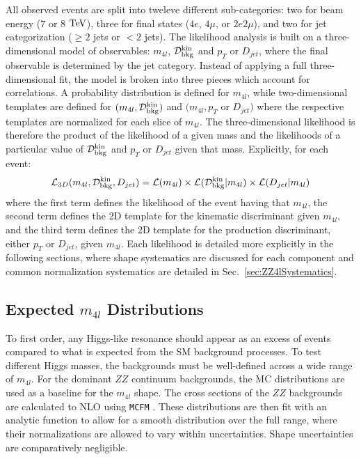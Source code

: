 All observed events are split into tweleve different sub-categories: two for beam energy ($7$ or $8$ $\rm{TeV}$), three for final states ($4e$, $4\mu$, or $2e2\mu$), and two for jet categorization ($\geq2$ jets or $<2$ jets). The likelihood analysis is built on a three-dimensional model of observables: $m_{4l}$, $\mathcal{D}_{\rm{bkg}}^{\rm{kin}}$ and $p_T$ or $D_{jet}$, where the final observable is determined by the jet category. Instead of applying a full three-dimensional fit, the model is broken into three pieces which account for correlations. A probability distribution is defined for $m_{4l}$, while two-dimensional templates are defined for $(m_{4l},\mathcal{D}_{\rm{bkg}}^{\rm{kin}})$ and $(m_{4l},p_T$ or $D_{jet})$ where the respective templates are normalized for each slice of $m_{4l}$. The three-dimensional likelihood is therefore the product of the likelihood of a given mass and the likelihoods of a particular value of $\mathcal{D}_{\rm{bkg}}^{\rm{kin}}$ and $p_T$ or $D_{jet}$ given that mass. Explicitly, for each event:
\begin{equation}
\label{eqn:likelihoodXS}
\mathcal{L}_{3D}(m_{4l},\mathcal{D}_{\rm{bkg}}^{\rm{kin}},D_{jet})=\mathcal{L}(m_{4l}) \times \mathcal{L}(\mathcal{D}_{\rm{bkg}}^{\rm{kin}}|m_{4l}) \times \mathcal{L}(D_{jet}|m_{4l})
\end{equation}
where the first term defines the likelihood of the event having that $m_{4l}$, the second term defines the 2D template for the kinematic discriminant given $m_{4l}$, and the third term defines the 2D template for the production discriminant, either $p_T$ or $D_{jet}$, given $m_{4l}$. Each likelihood is detailed more explicitly in the following sections, where shape systematics are discussed for each component and common normalization systematics are detailed in Sec.~\ref{sec:ZZ4lSystematics}.

\subsection{Expected $m_{4l}$ Distributions}
\label{sec:ZZ4lMassShape}

To first order, any Higgs-like resonance should appear as an excess of events compared to what is expected from the SM background processes. To test different Higgs masses, the backgrounds must be well-defined across a wide range of $m_{4l}$. For the dominant $ZZ$ continuum backgrounds, the MC distributions are used as a baseline for the $m_{4l}$ shape. The cross sections of the $ZZ$ backgrounds are calculated to NLO using {\tt MCFM} \cite{}. These distributions are then fit with an analytic function to allow for a smooth distribution over the full range, where their normalizations are allowed to vary within uncertainties. Shape uncertainties are comparatively negligible.

